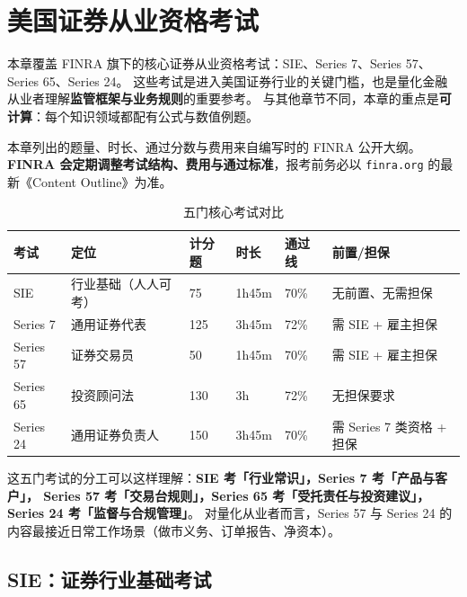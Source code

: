 \chapter{美国证券从业资格考试}

本章覆盖 FINRA 旗下的核心证券从业资格考试：SIE、Series 7、Series 57、Series 65、Series 24。
这些考试是进入美国证券行业的关键门槛，也是量化金融从业者理解\textbf{监管框架与业务规则}的重要参考。
与其他章节不同，本章的重点是\textbf{可计算}：每个知识领域都配有公式与数值例题。

\begin{warningbox}[考试参数具有时效性]
本章列出的题量、时长、通过分数与费用来自编写时的 FINRA 公开大纲。
\textbf{FINRA 会定期调整考试结构、费用与通过标准}，报考前务必以
\texttt{finra.org} 的最新《Content Outline》为准。
\end{warningbox}

\begin{table}[htbp]
\centering
\caption{五门核心考试对比}\label{tab:12-exams}
\tablefont
\begin{tabular}{@{}L{2.0cm}L{3.0cm}C{1.5cm}C{1.6cm}C{1.5cm}L{2.6cm}@{}}
\toprule
\textbf{考试} & \textbf{定位} & \textbf{计分题} & \textbf{时长} & \textbf{通过线} & \textbf{前置/担保} \\
\midrule
SIE & 行业基础（人人可考） & 75 & 1h45m & 70\% & 无前置、无需担保 \\
Series 7 & 通用证券代表 & 125 & 3h45m & 72\% & 需 SIE + 雇主担保 \\
Series 57 & 证券交易员 & 50 & 1h45m & 70\% & 需 SIE + 雇主担保 \\
Series 65 & 投资顾问法 & 130 & 3h & 72\% & 无担保要求 \\
Series 24 & 通用证券负责人 & 150 & 3h45m & 70\% & 需 Series 7 类资格 + 担保 \\
\bottomrule
\end{tabular}
\end{table}

\begin{keybox}
这五门考试的分工可以这样理解：\textbf{SIE 考「行业常识」，Series 7 考「产品与客户」，
Series 57 考「交易台规则」，Series 65 考「受托责任与投资建议」，Series 24 考「监督与合规管理」}。
对量化从业者而言，Series 57 与 Series 24 的内容最接近日常工作场景（做市义务、订单报告、净资本）。
\end{keybox}

\section{SIE：证券行业基础考试}

